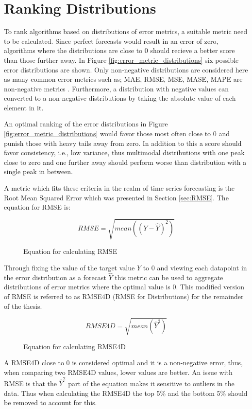\section{Ranking Distributions}
\label{sec:ranking_distributions}
To rank algorithms based on distributions of error metrics, a suitable metric need to be calculated. Since perfect forecasts would result in an error of zero, algorithms where the distributions are close to 0 should recieve a better score than those further away. In Figure \ref{fig:error_metric_distributions} six possible error distributions are shown. Only non-negative distributions are considered here as many common error metrics such as; MAE, RMSE, MSE, MASE, MAPE are non-negative metrics \cite{gluonts-github,hyndman_forecasting_3rd}. Furthermore, a distribution with negative values can converted to a non-negative distributions by taking the absolute value of each element in it.

An optimal ranking of the error distributions in Figure \ref{fig:error_metric_distributions} would favor those most often close to 0 and punish those with heavy tails away from zero. In addition to this a score should favor consistency, i.e., low variance, thus multimodal distributions with one peak close to zero and one further away should perform worse than distribution with a single peak in between.

A metric which fits these criteria in the realm of time series forecasting is the Root Mean Squared Error which was presented in Section \ref{sec:RMSE}. The equation for RMSE is:

\begin{figure}[h]
  \[RMSE = \sqrt{mean((Y - \hat{Y})^2)}\]
  \caption{Equation for calculating RMSE}
\end{figure}

Through fixing the value of the target value \(Y\) to 0 and viewing each datapoint in the error distribution as a forecast \(\hat{Y}\) this metric can be used to aggregate distributions of error metrics where the optimal value is 0. This modified version of RMSE is referred to as RMSE4D (RMSE for Distributions) for the remainder of the thesis.

\begin{figure}[h]
  \[RMSE4D = \sqrt{mean(\hat{Y}^2)}\]
  \caption{Equation for calculating RMSE4D}
\end{figure}

A RMSE4D close to 0 is considered optimal and it is a non-negative error, thus, when comparing two RMSE4D values, lower values are better. An issue with RMSE is that the \(\hat{Y}^2\) part of the equation makes it sensitive to outliers in the data. Thus when calculating the RMSE4D the top 5\% and the bottom 5\% should be removed to account for this.

